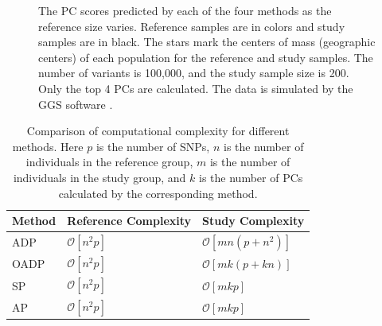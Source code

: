 \documentclass{article}
\newcommand{\bO}{\mathcal{O}}
\begin{document}
\begin{figure}
\begin{subfigure}{.5\textwidth}
\end{subfigure}
\caption{
  The PC scores predicted by each of the four methods
  as the reference size varies.
  Reference samples are in colors
  and study samples are in black.
  The stars mark the centers of mass (geographic centers) of each population for the reference and study samples.
  The number of variants is 100,000,
  and the study sample size is 200.
  Only the top 4 PCs are calculated.
  The data is simulated by the GGS software \citep{mathieson2012differential}.
  \label{fig:ggsim}
}
\end{figure}

\begin{table}[h]
  \centering
  \begin{tabular}{|l|l|l|}
    \hline
    Method & Reference Complexity & Study Complexity \\ 
    \hline
    ADP & $\bO[n^2 p]$ & $\bO[mn(p + n^2)]$ \\
    \hline
    OADP & $\bO[n^2 p]$ & $\bO[mk(p + k n)]$ \\
    \hline
    SP & $\bO[n^2p]$ & $\bO[mkp]$ \\
    \hline
    AP & $\bO[n^2p]$ &  $\bO[mkp]$ \\
    \hline
  \end{tabular}
  \caption{
    Comparison of computational complexity for different methods.
    Here $p$ is the number of SNPs,
    $n$ is the number of individuals in the reference group,
    $m$ is the number of individuals in the  study group,
    and $k$ is the number of PCs calculated by the corresponding method.
  }
  \label{tbl:cplx}
\end{table}
\end{document}
